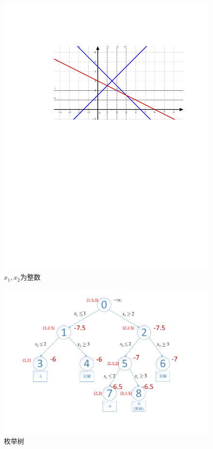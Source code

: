 \documentclass[UTF8]{ctexart}
\begin{document}
\begin{enumerate}
\begin{figure}[H]
\small
\centering
\includegraphics[width=12cm]{3.pdf}
\caption{$x_1,x_2$为整数}
\end{figure}

\begin{figure}[H]
\small
\centering
\includegraphics[width=12cm]{4.pdf}
\caption{枚举树}
\end{figure}
\end{enumerate}
\end{document}
